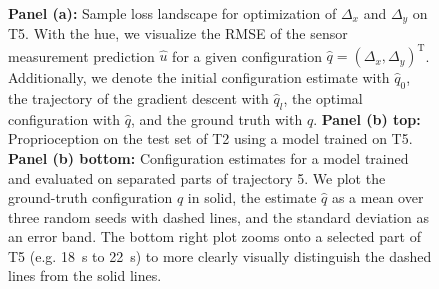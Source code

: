 \begin{figure}[hbt]
  \centering
  \\ %
  
  \caption{\textbf{Panel (a):} Sample loss landscape for optimization of $\Delta_x$ and $\Delta_y$ on T5. With the hue, we visualize the RMSE of the sensor measurement prediction $\hat{u}$ for a given configuration $\hat{q} = (\Delta_x, \Delta_y)^\mathrm{T}$. Additionally, we denote the initial configuration estimate with $\hat{q}_0$, the trajectory of the gradient descent with $\hat{q}_l$, the optimal configuration with $\hat{q}$, and the ground truth with $q$. \textbf{Panel (b) top:} Proprioception on the test set of T2 using a model trained on T5. \textbf{Panel (b) bottom:} Configuration estimates for a model trained and evaluated on separated parts of trajectory 5. We plot the ground-truth configuration $q$ in solid, the estimate $\hat{q}$ as a mean over three random seeds with dashed lines, and the standard deviation as an error band. The bottom right plot zooms onto a selected part of T5 (e.g. \SI{18}{s} to \SI{22}{s}) to more clearly visually distinguish the dashed lines from the solid lines.}
  \label{fig:promasens:results_trajectories}
\end{figure}

